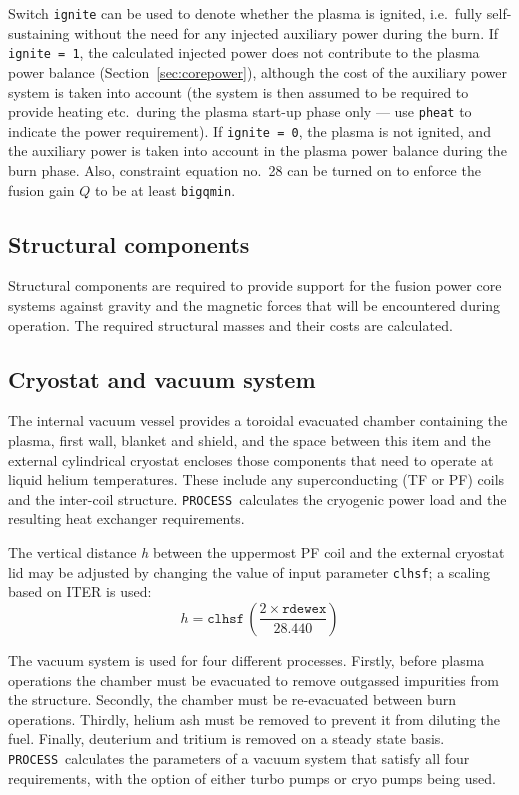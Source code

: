 \documentclass[11pt,a4paper]{report}
\newcommand{\process}{\mbox{\texttt{PROCESS}}}
\begin{document}
Switch \texttt{ignite} can be used to denote whether the plasma is ignited,
i.e.\ fully self-sustaining without the need for any injected auxiliary power
during the burn. If \texttt{ignite = 1}, the calculated injected power does
not contribute to the plasma power balance (Section~\ref{sec:corepower}),
although the cost of the auxiliary power system is taken into account (the
system is then assumed to be required to provide heating etc.\ during the
plasma start-up phase only --- use \texttt{pheat} to indicate the power
requirement). If \texttt{ignite = 0}, the plasma is not ignited, and the
auxiliary power is taken into account in the plasma power balance during the
burn phase. Also, constraint equation no.\ 28 can be turned on to enforce the
fusion gain $Q$ to be at least \texttt{bigqmin}.

\subsection{Structural components}

Structural components are required to provide support for the fusion power
core systems against gravity and the magnetic forces that will be encountered
during operation. The required structural masses and their costs are
calculated.

\subsection{Cryostat and vacuum system}

The internal vacuum vessel provides a toroidal evacuated chamber containing
the plasma, first wall, blanket and shield, and the space between this item
and the external cylindrical cryostat encloses those components that need to
operate at liquid helium temperatures. These include any superconducting (TF
or PF) coils and the inter-coil structure. \process\ calculates the cryogenic
power load and the resulting heat exchanger requirements.

The vertical distance \textit{h}\/ between the uppermost PF coil and the
external cryostat lid may be adjusted by changing the value of input parameter
\texttt{clhsf}; a scaling based on ITER is used:
\begin{equation}
h = \mathtt{clhsf} \, \left( \frac{2 \times \mathtt{rdewex}}{28.440} \right)
\end{equation}

The vacuum system is used for four different processes. Firstly, before plasma
operations the chamber must be evacuated to remove outgassed impurities from
the structure. Secondly, the chamber must be re-evacuated between burn
operations. Thirdly, helium ash must be removed to prevent it from diluting
the fuel. Finally, deuterium and tritium is removed on a steady state
basis. \process\ calculates the parameters of a vacuum system that satisfy
all four requirements, with the option of either turbo pumps or cryo pumps
being used.
\end{document}
